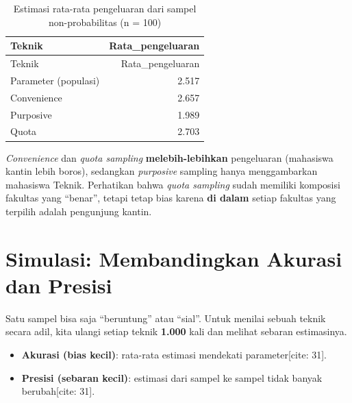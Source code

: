 \documentclass[
  indonesian,
  letterpaper,
]{book}
\providecommand{\tightlist}{%
  \setlength{\itemsep}{0pt}\setlength{\parskip}{0pt}}
\begin{document}
\begin{longtable}[]{@{}lr@{}}
\caption{Estimasi rata-rata pengeluaran dari sampel non-probabilitas (n
= 100)}\tabularnewline
\toprule\noalign{}
Teknik & Rata\_pengeluaran \\
\midrule\noalign{}
\endfirsthead
\toprule\noalign{}
Teknik & Rata\_pengeluaran \\
\midrule\noalign{}
\endhead
\bottomrule\noalign{}
\endlastfoot
Parameter (populasi) & 2.517 \\
Convenience & 2.657 \\
Purposive & 1.989 \\
Quota & 2.703 \\
\end{longtable}

\emph{Convenience} dan \emph{quota sampling} \textbf{melebih-lebihkan}
pengeluaran (mahasiswa kantin lebih boros), sedangkan \emph{purposive}
sampling hanya menggambarkan mahasiswa Teknik. Perhatikan bahwa
\emph{quota sampling} sudah memiliki komposisi fakultas yang ``benar'',
tetapi tetap bias karena \textbf{di dalam} setiap fakultas yang terpilih
adalah pengunjung kantin.

\section{Simulasi: Membandingkan Akurasi dan
Presisi}\label{simulasi-membandingkan-akurasi-dan-presisi}

Satu sampel bisa saja ``beruntung'' atau ``sial''. Untuk menilai sebuah
teknik secara adil, kita ulangi setiap teknik \textbf{1.000} kali dan
melihat sebaran estimasinya.

\begin{itemize}
\tightlist
\item
  \textbf{Akurasi (bias kecil)}: rata-rata estimasi mendekati
  parameter{[}cite: 31{]}.
\item
  \textbf{Presisi (sebaran kecil)}: estimasi dari sampel ke sampel tidak
  banyak berubah{[}cite: 31{]}.
\end{itemize}
\end{document}
